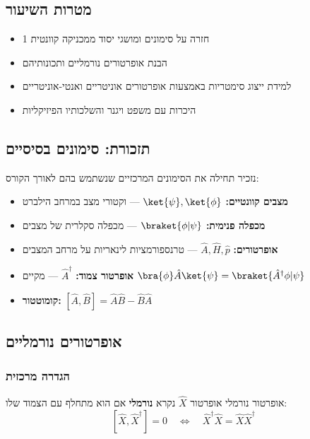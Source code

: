 
\subsection*{מטרות השיעור}
\begin{itemize}
    \item חזרה על סימונים ומושגי יסוד ממכניקה קוונטית 1
    \item הבנת אופרטורים נורמליים ותכונותיהם
    \item למידת ייצוג סימטריות באמצעות אופרטורים אוניטריים ואנטי-אוניטריים
    \item היכרות עם משפט ויגנר והשלכותיו הפיזיקליות
\end{itemize}

\subsection*{תזכורת: סימונים בסיסיים}
נזכיר תחילה את הסימונים המרכזיים שנשתמש בהם לאורך הקורס:
\begin{itemize}
    \item \textbf{מצבים קוונטיים:} $\ket{\psi}, \ket{\phi}$ — וקטורי מצב במרחב הילברט
    \item \textbf{מכפלה פנימית:} $\braket{\phi|\psi}$ — מכפלה סקלרית של מצבים
    \item \textbf{אופרטורים:} $\hat{A}, \hat{H}, \hat{p}$ — טרנספורמציות לינאריות על מרחב המצבים
    \item \textbf{אופרטור צמוד:} $\hat{A}^\dagger$ — מקיים $\bra{\phi}\hat{A}\ket{\psi} = \braket{\hat{A}^\dagger\phi|\psi}$
    \item \textbf{קומוטטור:} $[\hat{A},\hat{B}] = \hat{A}\hat{B} - \hat{B}\hat{A}$
\end{itemize}

\subsection{אופרטורים נורמליים}

\subsubsection*{הגדרה מרכזית}

\begin{definitionbox}{אופרטור נורמלי}
אופרטור $\hat{X}$ נקרא \textbf{נורמלי} אם הוא מתחלף עם הצמוד שלו:
\[
[\hat{X},\hat{X}^{\dagger}]=0 \quad \iff \quad \hat{X}^{\dagger}\hat{X} = \hat{X}\hat{X}^{\dagger}
\]
\end{definitionbox}


